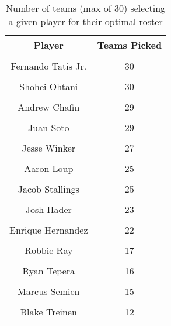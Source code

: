 \begin{table}

\caption{Number of teams (max of 30) selecting a given player for their optimal roster}
\centering
\fontsize{7}{9}\selectfont
\begin{tabular}[t]{|>{}c|>{}c|}
\hline
Player & Teams Picked\\
\hline
\cellcolor{gray!6}{Brandon Woodruff} & \cellcolor{gray!6}{30}\\
\hline
Fernando Tatis Jr. & 30\\
\hline
\cellcolor{gray!6}{Mike Zunino} & \cellcolor{gray!6}{30}\\
\hline
Shohei Ohtani & 30\\
\hline
\cellcolor{gray!6}{Walker Buehler} & \cellcolor{gray!6}{30}\\
\hline
Andrew Chafin & 29\\
\hline
\cellcolor{gray!6}{Carlos Rodon} & \cellcolor{gray!6}{29}\\
\hline
Juan Soto & 29\\
\hline
\cellcolor{gray!6}{Matt Olson} & \cellcolor{gray!6}{28}\\
\hline
Jesse Winker & 27\\
\hline
\cellcolor{gray!6}{Jose Ramirez} & \cellcolor{gray!6}{26}\\
\hline
Aaron Loup & 25\\
\hline
\cellcolor{gray!6}{Carlos Correa} & \cellcolor{gray!6}{25}\\
\hline
Jacob Stallings & 25\\
\hline
\cellcolor{gray!6}{Aaron Judge} & \cellcolor{gray!6}{24}\\
\hline
Josh Hader & 23\\
\hline
\cellcolor{gray!6}{Kendall Graveman} & \cellcolor{gray!6}{23}\\
\hline
Enrique Hernandez & 22\\
\hline
\cellcolor{gray!6}{Chad Green} & \cellcolor{gray!6}{19}\\
\hline
Robbie Ray & 17\\
\hline
\cellcolor{gray!6}{Liam Hendriks} & \cellcolor{gray!6}{16}\\
\hline
Ryan Tepera & 16\\
\hline
\cellcolor{gray!6}{Brandon Lowe} & \cellcolor{gray!6}{15}\\
\hline
Marcus Semien & 15\\
\hline
\cellcolor{gray!6}{Zack Wheeler} & \cellcolor{gray!6}{14}\\
\hline
Blake Treinen & 12\\

\end{tabular}
\end{table}
